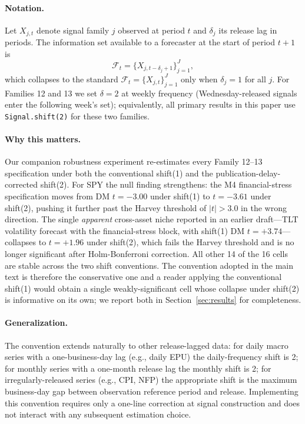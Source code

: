 \documentclass[12pt,a4paper]{article}
\begin{document}
\paragraph{Notation.} Let $X_{j,t}$ denote signal family $j$ observed at period $t$ and $\delta_j$ its release lag in periods. The information set available to a forecaster at the start of period $t+1$ is
\begin{equation}
\mathcal{F}_t = \{X_{j,t-\delta_j+1}\}_{j=1}^{J},
\label{eq:info_set_pub_delay}
\end{equation}
which collapses to the standard $\mathcal{F}_t = \{X_{j,t}\}_{j=1}^J$ only when $\delta_j = 1$ for all $j$. For Families 12 and 13 we set $\delta = 2$ at weekly frequency (Wednesday-released signals enter the following week's set); equivalently, all primary results in this paper use \texttt{Signal.shift(2)} for these two families.

\paragraph{Why this matters.} Our companion robustness experiment re-estimates every Family 12--13 specification under both the conventional shift(1) and the publication-delay-corrected shift(2). For SPY the null finding strengthens: the M4 financial-stress specification moves from DM $t=-3.00$ under shift(1) to $t=-3.61$ under shift(2), pushing it further past the Harvey threshold of $|t|>3.0$ in the wrong direction. The single \emph{apparent} cross-asset niche reported in an earlier draft---TLT volatility forecast with the financial-stress block, with shift(1) DM $t=+3.74$---collapses to $t=+1.96$ under shift(2), which fails the Harvey threshold and is no longer significant after Holm-Bonferroni correction. All other 14 of the 16 cells are stable across the two shift conventions. The convention adopted in the main text is therefore the conservative one and a reader applying the conventional shift(1) would obtain a single weakly-significant cell whose collapse under shift(2) is informative on its own; we report both in Section~\ref{sec:results} for completeness.

\paragraph{Generalization.} The convention extends naturally to other release-lagged data: for daily macro series with a one-business-day lag (e.g., daily EPU) the daily-frequency shift is 2; for monthly series with a one-month release lag the monthly shift is 2; for irregularly-released series (e.g., CPI, NFP) the appropriate shift is the maximum business-day gap between observation reference period and release. Implementing this convention requires only a one-line correction at signal construction and does not interact with any subsequent estimation choice.
\end{document}
